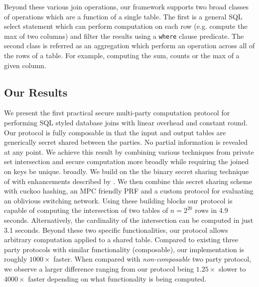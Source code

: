 Beyond these various join operations, our framework supports two broad classes of operations which are a function of a single table. The first is a general SQL select statement which can perform computation on each row (e.g. compute the max of two columns) and filter the results using a \texttt{where} clause predicate. The second class is referred as an aggregation which perform an operation across all of the rows of a table. For example, computing the sum, counts or the max of a given column. 
\subsection{Our Results}

We present the first practical secure multi-party computation protocol for performing SQL styled database joins with linear overhead and constant round. Our protocol is fully composable in that the input and output tables are generically secret shared between the parties. 
\iffullversion
	No partial information is revealed at any point. 
\fi
	We achieve this result by combining various techniques from private set intersection and secure computation more 
\iffullversion 
	broadly while requiring the joined on keys be unique.
\else
	broadly.
\fi
 We build on the the binary secret sharing technique of \cite{highthroughput} with enhancements described by \cite{aby3}. We then combine this secret sharing scheme with cuckoo hashing\cite{usenix:PSZ14}, an MPC friendly PRF\cite{lowmc} and a custom protocol for evaluating an oblivious switching network\cite{MS13}. Using these building blocks our protocol is capable of computing the intersection of two tables of $n=2^{20}$ rows in 4.9 seconds. 
\iffullversion 
	Alternatively, the cardinality of the intersection can be computed in just 3.1 seconds.
\fi
  Beyond these two specific functionalities, our protocol allows arbitrary computation applied to a shared table. Compared to existing three party protocols with similar functionality (composable), our implementation is roughly $1000\times$ faster. When compared with \emph{non-composable} two party protocol, we observe a larger difference ranging from our protocol being $1.25\times$ slower to $4000\times$ faster depending on what functionality is being computed. 


